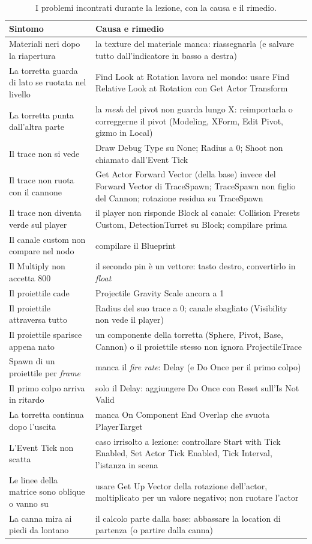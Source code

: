 \begin{table}[htbp]
\centering
\small
\begin{tabular}{@{}p{5.4cm}p{8.6cm}@{}}
\toprule
\textbf{Sintomo} & \textbf{Causa e rimedio} \\
\midrule
Materiali neri dopo la riapertura & la texture del materiale manca: riassegnarla (e
salvare tutto dall'indicatore in basso a destra) \\
La torretta guarda di lato se ruotata nel livello & Find Look at Rotation lavora nel
mondo: usare Find Relative Look at Rotation con Get Actor Transform \\
La torretta punta dall'altra parte & la \emph{mesh} del pivot non guarda lungo X:
reimportarla o correggerne il pivot (Modeling, XForm, Edit Pivot, gizmo in Local) \\
Il trace non si vede & Draw Debug Type su None; Radius a 0; Shoot non chiamato
dall'Event Tick \\
Il trace non ruota con il cannone & Get Actor Forward Vector (della base) invece del
Forward Vector di TraceSpawn; TraceSpawn non figlio del Cannon; rotazione residua su
TraceSpawn \\
Il trace non diventa verde sul player & il player non risponde Block al canale: Collision
Presets Custom, DetectionTurret su Block; compilare prima \\
Il canale custom non compare nel nodo & compilare il Blueprint \\
Il Multiply non accetta 800 & il secondo pin è un vettore: tasto destro, convertirlo
in \emph{float} \\
Il proiettile cade & Projectile Gravity Scale ancora a 1 \\
Il proiettile attraversa tutto & Radius del suo trace a 0; canale sbagliato (Visibility
non vede il player) \\
Il proiettile sparisce appena nato & un componente della torretta (Sphere, Pivot, Base,
Cannon) o il proiettile stesso non ignora ProjectileTrace \\
Spawn di un proiettile per \emph{frame} & manca il \emph{fire rate}: Delay (e Do Once
per il primo colpo) \\
Il primo colpo arriva in ritardo & solo il Delay: aggiungere Do Once con Reset sull'Is
Not Valid \\
La torretta continua dopo l'uscita & manca On Component End Overlap che svuota
PlayerTarget \\
L'Event Tick non scatta & caso irrisolto a lezione: controllare Start with Tick Enabled,
Set Actor Tick Enabled, Tick Interval, l'istanza in scena \\
Le linee della matrice sono oblique o vanno su & usare Get Up Vector della rotazione
dell'actor, moltiplicato per un valore negativo; non ruotare l'actor \\
La canna mira ai piedi da lontano & il calcolo parte dalla base: abbassare la location di
partenza (o partire dalla canna) \\
\bottomrule
\end{tabular}
\caption{I problemi incontrati durante la lezione, con la causa e il rimedio.}
\label{ue5:tab:errori}
\end{table}


